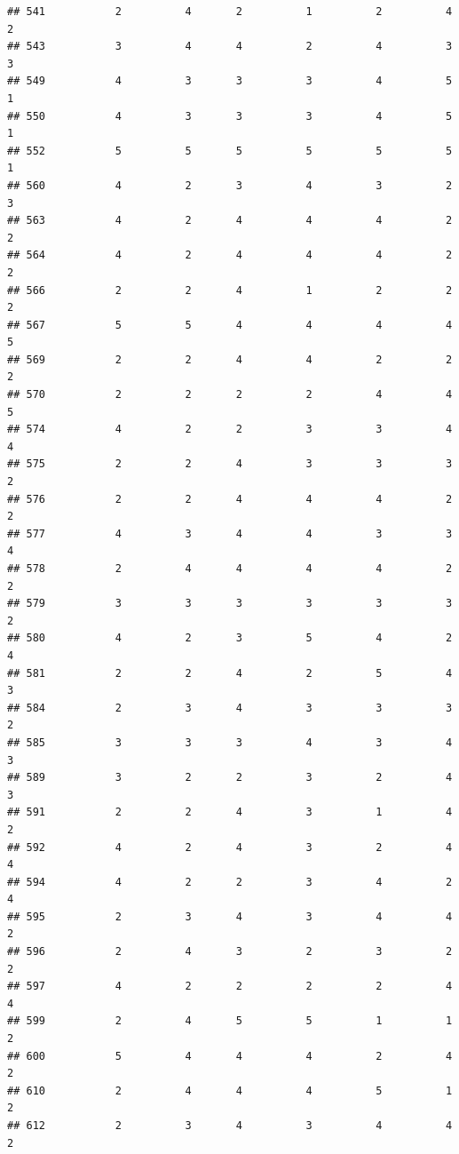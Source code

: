 \documentclass[
]{article}
\begin{document}
\begin{verbatim}
## 541           2          4       2          1          2          4        2
## 543           3          4       4          2          4          3        3
## 549           4          3       3          3          4          5        1
## 550           4          3       3          3          4          5        1
## 552           5          5       5          5          5          5        1
## 560           4          2       3          4          3          2        3
## 563           4          2       4          4          4          2        2
## 564           4          2       4          4          4          2        2
## 566           2          2       4          1          2          2        2
## 567           5          5       4          4          4          4        5
## 569           2          2       4          4          2          2        2
## 570           2          2       2          2          4          4        5
## 574           4          2       2          3          3          4        4
## 575           2          2       4          3          3          3        2
## 576           2          2       4          4          4          2        2
## 577           4          3       4          4          3          3        4
## 578           2          4       4          4          4          2        2
## 579           3          3       3          3          3          3        2
## 580           4          2       3          5          4          2        4
## 581           2          2       4          2          5          4        3
## 584           2          3       4          3          3          3        2
## 585           3          3       3          4          3          4        3
## 589           3          2       2          3          2          4        3
## 591           2          2       4          3          1          4        2
## 592           4          2       4          3          2          4        4
## 594           4          2       2          3          4          2        4
## 595           2          3       4          3          4          4        2
## 596           2          4       3          2          3          2        2
## 597           4          2       2          2          2          4        4
## 599           2          4       5          5          1          1        2
## 600           5          4       4          4          2          4        2
## 610           2          4       4          4          5          1        2
## 612           2          3       4          3          4          4        2

\end{verbatim}
\end{document}
